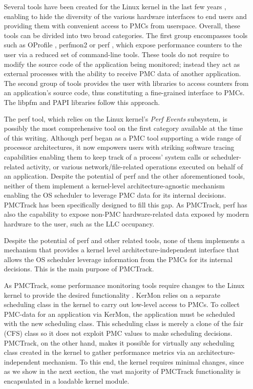 Several tools have been created for the Linux kernel in the last few
years \cite{oprofile,perfmon2,perf,papi,likwid,schedmon}, enabling to
hide the diversity of the various hardware interfaces to end users and
providing them with convenient access to PMCs from userspace. Overall,
these tools can be divided into two broad categories. The first group
encompasses tools such as OProfile \cite{oprofile}, perfmon2
\cite{perfmon2} or perf \cite{perf}, which expose performance counters
to the user via a reduced set of command-line tools. These tools do not
require to modify the source code of the application being monitored;
instead they act as external processes with the ability to receive PMC
data of another application. The second group of tools provides the user
with libraries to access counters from an application's source code,
thus constituting a fine-grained interface to PMCs. The libpfm
\cite{perfmon2} and PAPI \cite{papi} libraries follow this approach.

The perf \cite{perf} tool, which relies on the Linux kernel's
\emph{Perf Events} \cite{perfevents} subsystem, is possibly the most
comprehensive tool on the first category available at the time of this
writing. Although perf began as a PMC tool supporting a wide range of
processor architectures, it now empowers users with striking software
tracing capabilities enabling them to keep track of a process' system
calls or scheduler-related activity, or various network/file-related
operations executed on behalf of an application. Despite the potential
of perf and the other aforementioned tools, neither of them implement a
kernel-level architecture-agnostic mechanism enabling the OS scheduler
to leverage PMC data for its internal decisions. PMCTrack has been
specifically designed to fill this gap. As PMCTrack, perf has also the
capability to expose non-PMC hardware-related data exposed by modern
hardware to the user, such as the LLC occupancy.

Despite the potential of perf and other related tools, none of them
implements a mechanism that provides a kernel level
architecture-independent interface that allows the OS scheduler leverage
information from the PMCs for its internal decisions. This is the main
purpose of PMCTrack.

As PMCTrack, some performance monitoring tools require changes to the
Linux kernel to provide the desired functionality
\cite{perfmon2,kermon}. KerMon \cite{kermon} relies on a separate
scheduling class in the kernel to carry out low-level access to PMCs. To
collect PMC-data for an application via KerMon, the application must be
scheduled with the new scheduling class. This scheduling class is merely
a clone of the fair (CFS) class so it does not exploit PMC values to
make scheduling decisions. PMCTrack, on the other hand, makes it
possible for virtually any scheduling class created in the kernel to
gather performance metrics via an architecture-independent mechanism. To
this end, the kernel requires minimal changes, since as we show in the
next section, the vast majority of PMCTrack functionality is
encapsulated in a loadable kernel module.


